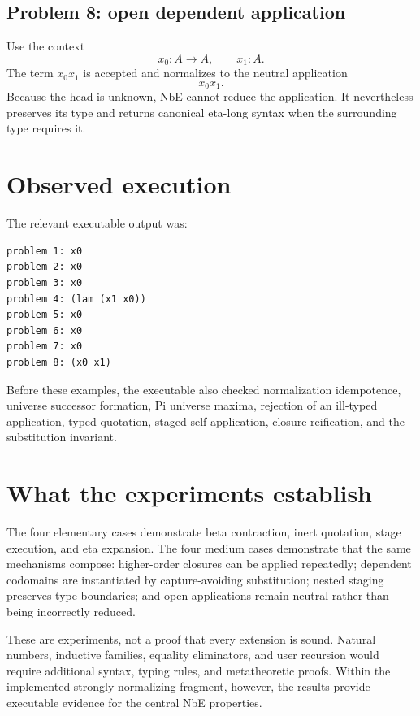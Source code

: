 \documentclass[11pt,a4paper]{article}
\begin{document}
\subsection{Problem 8: open dependent application}
Use the context
\[
x_0:A\to A,\qquad x_1:A.
\]
The term $x_0x_1$ is accepted and normalizes to the neutral application
\[
\boxed{x_0x_1}.
\]
Because the head is unknown, NbE cannot reduce the application. It nevertheless preserves its type and returns canonical eta-long syntax when the surrounding type requires it.

\section{Observed execution}
The relevant executable output was:
\begin{lstlisting}
problem 1: x0
problem 2: x0
problem 3: x0
problem 4: (lam (x1 x0))
problem 5: x0
problem 6: x0
problem 7: x0
problem 8: (x0 x1)
\end{lstlisting}

Before these examples, the executable also checked normalization idempotence, universe successor formation, Pi universe maxima, rejection of an ill-typed application, typed quotation, staged self-application, closure reification, and the substitution invariant.

\section{What the experiments establish}
The four elementary cases demonstrate beta contraction, inert quotation, stage execution, and eta expansion. The four medium cases demonstrate that the same mechanisms compose: higher-order closures can be applied repeatedly; dependent codomains are instantiated by capture-avoiding substitution; nested staging preserves type boundaries; and open applications remain neutral rather than being incorrectly reduced.

These are experiments, not a proof that every extension is sound. Natural numbers, inductive families, equality eliminators, and user recursion would require additional syntax, typing rules, and metatheoretic proofs. Within the implemented strongly normalizing fragment, however, the results provide executable evidence for the central NbE properties.
\end{document}
